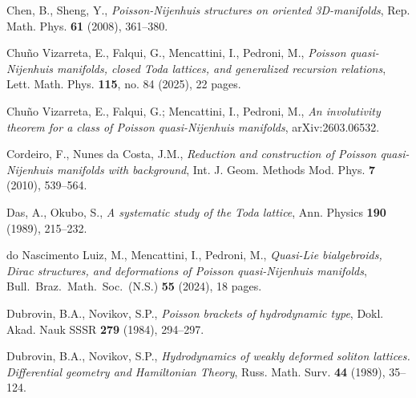 \documentclass[12pt]{article}
\begin{document}

 Chen, B., Sheng, Y., {\it Poisson-Nijenhuis structures on oriented 3D-manifolds}, 
Rep. Math. Phys. {\bf 61} (2008), 361--380. 

  Chu\~no Vizarreta, E., Falqui, G., Mencattini, I., Pedroni, M.,  {\it Poisson quasi-Nijenhuis manifolds, closed Toda lattices, and generalized recursion relations}, Lett. Math. Phys. {\bf 115}, no. 84 (2025), 22 pages. 

  Chu\~no Vizarreta, E., Falqui, G.; Mencattini, I., Pedroni,  M., {\it An involutivity theorem for a class of Poisson quasi-Nijenhuis manifolds}, arXiv:2603.06532. %

 Cordeiro, F., Nunes da Costa, J.M.,
{\it Reduction and construction of Poisson quasi-Nijenhuis manifolds with background}, 
Int. J. Geom. Methods Mod. Phys. {\bf 7} (2010), 539--564.




 Das, A., Okubo, S., {\it A systematic study of the Toda lattice}, Ann. Physics {\bf 190} (1989), 215--232.

 do Nascimento Luiz, M., Mencattini, I., Pedroni, M.,
{\it Quasi-Lie bialgebroids, Dirac structures, and deformations of Poisson quasi-Nijenhuis manifolds\/}, 
Bull.\ Braz.\ Math.\ Soc.\ (N.S.) {\bf 55} (2024), 18 pages.

 Dubrovin, B.A., Novikov, S.P., {\it Poisson brackets of hydrodynamic type}, Dokl. Akad. Nauk SSSR {\bf 279} (1984),  294--297.

 Dubrovin, B.A., Novikov, S.P., {\it Hydrodynamics of weakly deformed soliton lattices. Differential geometry and Hamiltonian Theory}, Russ. Math. Surv. {\bf 44} (1989), 35--124.


\end{document}
